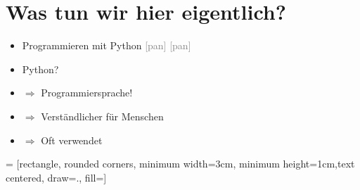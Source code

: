 \section{Was tun wir hier eigentlich?}
\begin{frame}
    \slidehead
    \begin{itemize}
        \item Programmieren mit Python \textcolor{gray}{[\textprimstress pa\textsci \texttheta n] [\textprimstress pa\textsci \texttheta \textscripta n]}
            \pause
        \item Python?
            \pause
        \item[] $\Rightarrow$ Programmiersprache!
        \item[] $\Rightarrow$ Verständlicher für Menschen
        \item[] $\Rightarrow$ Oft verwendet
    \end{itemize}

    \pause
    \vspace{0.75cm}

     = [rectangle, rounded corners, minimum width=3cm, minimum height=1cm,text centered, draw=., fill=]
    \centering

\end{frame}

\begin{comment}
    \section{Das erste Programm}
    \subsection{Wie fange ich an?}
    \begin{frame}
        \slidehead
        \begin{itemize}
            \item Befehle bestehen aus Text
            \item Mit einem einfachen Texteditor schreibt man Befehle in eine Datei
            \item Anschließend interpretiert der Computer die Befehle
        \end{itemize}
    \end{frame}
\end{comment}

